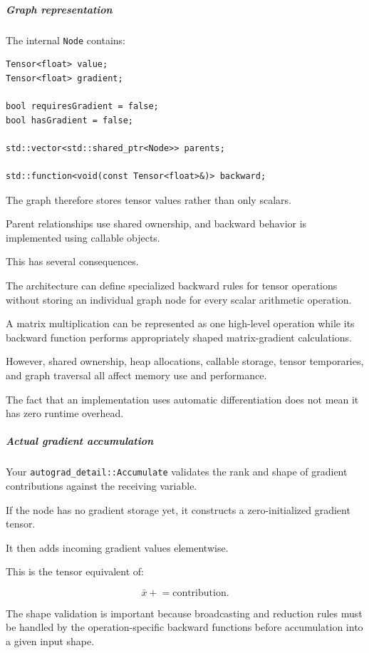\subparagraph{Graph representation}\label{graph-representation}

The internal \texttt{Node} contains:

\begin{verbatim}
Tensor<float> value;
Tensor<float> gradient;

bool requiresGradient = false;
bool hasGradient = false;

std::vector<std::shared_ptr<Node>> parents;

std::function<void(const Tensor<float>&)> backward;
\end{verbatim}

The graph therefore stores tensor values rather than only scalars.

Parent relationships use shared ownership, and backward behavior is implemented using callable objects.

This has several consequences.

The architecture can define specialized backward rules for tensor operations without storing an individual graph node for every scalar arithmetic operation.

A matrix multiplication can be represented as one high-level operation while its backward function performs appropriately shaped matrix-gradient calculations.

However, shared ownership, heap allocations, callable storage, tensor temporaries, and graph traversal all affect memory use and performance.

The fact that an implementation uses automatic differentiation does not mean it has zero runtime overhead.

\subparagraph{Actual gradient accumulation}\label{actual-gradient-accumulation}

Your \texttt{autograd\_detail::Accumulate} validates the rank and shape of gradient contributions against the receiving variable.

If the node has no gradient storage yet, it constructs a zero-initialized gradient tensor.

It then adds incoming gradient values elementwise.

This is the tensor equivalent of:

\[
\bar x\mathrel{+}=\text{contribution}.
\]

The shape validation is important because broadcasting and reduction rules must be handled by the operation-specific backward functions before accumulation into a given input shape.


